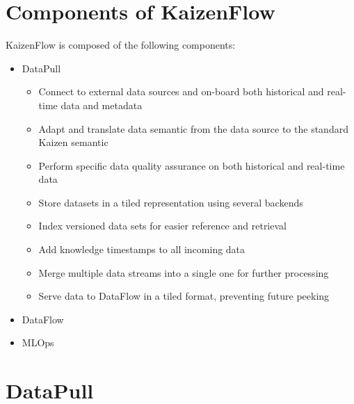 \documentclass[11pt, reqno]{amsart}
\def\tightlist{}
\theoremstyle{definition}
\theoremstyle{remark}
\begin{document}
  \section{Components of KaizenFlow}
  KaizenFlow is composed of the following components:

  \begin{itemize}
    \tightlist

    \item DataPull

      \begin{itemize}
        \tightlist

        \item Connect to external data sources and on-board both historical and real-time
          data and metadata

        \item Adapt and translate data semantic from the data source to the standard
          Kaizen semantic

        \item Perform specific data quality assurance on both historical and real-time
          data

        \item Store datasets in a tiled representation using several backends

        \item Index versioned data sets for easier reference and retrieval

        \item Add knowledge timestamps to all incoming data

        \item Merge multiple data streams into a single one for further processing

        \item Serve data to DataFlow in a tiled format, preventing future
          peeking
      \end{itemize}

    \item DataFlow

    \item MLOps
  \end{itemize}

  \section{DataPull}
\end{document}
